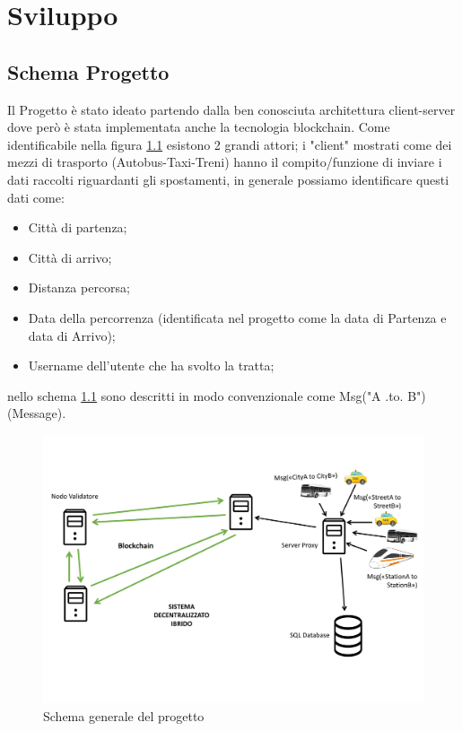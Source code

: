 \documentclass[11pt,a4paper,titlepage]{report}
\begin{document}
\chapter{Sviluppo}
\section{Schema Progetto}\label{Schema-Progetto}
Il Progetto è stato ideato partendo dalla ben conosciuta architettura client-server dove però è stata implementata anche la tecnologia blockchain. Come identificabile nella figura \ref{fig:sch} esistono 2 grandi attori; i "client" mostrati come dei mezzi di trasporto (Autobus-Taxi-Treni) hanno il compito/funzione di inviare i dati raccolti riguardanti gli spostamenti, in generale possiamo identificare questi dati come: 
\begin{itemize}
\item Città di partenza;
\item Città di arrivo;
\item Distanza percorsa;
\item Data della percorrenza (identificata nel progetto come la data di Partenza e data di Arrivo);
\item Username dell'utente che ha svolto la tratta;
\end{itemize}
nello schema \ref{fig:sch} sono descritti in modo convenzionale come Msg("A .to. B") (Message).
\begin{figure}[h]
	\includegraphics[width=\textwidth]{Schema_Progetto}
	\centering
	\caption{Schema generale del progetto}
	\label{fig:sch}
\end{figure}
\end{document}
